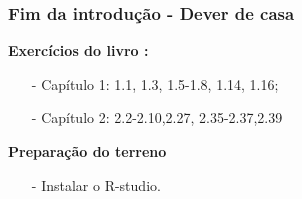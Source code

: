 \documentclass[14pt]{beamer}
\begin{document}
	\begin{frame}
	\frametitle{Fim da introdução - Dever de casa}
		\textbf{Exercícios do livro \cite{Agresti2018}:}
		\begin{itemize}
			\item[-] Capítulo 1: 1.1, 1.3, 1.5-1.8, 1.14, 1.16;
			\item[-] Capítulo 2: 2.2-2.10,2.27, 2.35-2.37,2.39
		\end{itemize}
		\textbf{Preparação do terreno}
		\begin{itemize}
			\item[-] Instalar o R-studio.
		\end{itemize}	

	\end{frame}   
\end{document}
